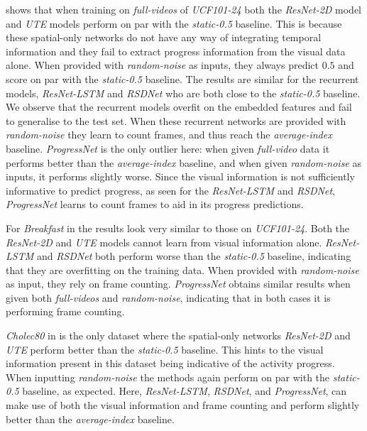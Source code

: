  shows that when training on \textsl{full-videos} of \textsl{UCF101-24} both the \textsl{ResNet-2D} model and \textsl{UTE} models perform on par with the \textsl{static-0.5} baseline.
This is because these spatial-only networks do not have any way of integrating temporal information and they fail to extract progress information from the visual data alone. 
When provided with \textsl{random-noise} as inputs, they always predict $0.5$ and score on par with the \textsl{static-0.5} baseline. 
The results are similar for the recurrent models, \textsl{ResNet-LSTM} and \textsl{RSDNet} who are both close to the \textsl{static-0.5} baseline. 
We observe that the recurrent models overfit on the embedded features and fail to generalise to the test set. 
When these recurrent networks are provided with \textsl{random-noise} they learn to count frames, and thus reach the \textsl{average-index} baseline. 
\textsl{ProgressNet} is the only outlier here: when given \textsl{full-video} data it performs better than the \textsl{average-index} baseline, and when given \textsl{random-noise} as inputs, it performs slightly worse. 
Since the visual information is not sufficiently informative to predict progress, as seen for the \textsl{ResNet-LSTM} and \textsl{RSDNet}, \textsl{ProgressNet} learns to count frames to aid in its progress predictions.

For \textsl{Breakfast} in  the results look very similar to those on \textsl{UCF101-24}. 
Both the \textsl{ResNet-2D} and \textsl{UTE} models cannot learn from visual information alone. \textsl{ResNet-LSTM} and \textsl{RSDNet} both perform worse than the \textsl{static-0.5} baseline, indicating that they are overfitting on the training data. 
When provided with \textsl{random-noise} as input, they rely on frame counting. 
\textsl{ProgressNet} obtains similar results when given both \textsl{full-videos} and \textsl{random-noise}, indicating that in both cases it is performing frame counting.

\textsl{Cholec80} in  is the only dataset where the spatial-only networks \textsl{ResNet-2D} and \textsl{UTE} perform better than the \textsl{static-0.5} baseline.
This hints to the visual information present in this dataset being indicative of the activity progress. 
When inputting \textsl{random-noise} the methods again perform on par with the \textsl{static-0.5} baseline, as expected. 
Here, \textsl{ResNet-LSTM}, \textsl{RSDNet}, and \textsl{ProgressNet}, can make use of both the visual information and frame counting and perform slightly better than the \textsl{average-index} baseline. 

